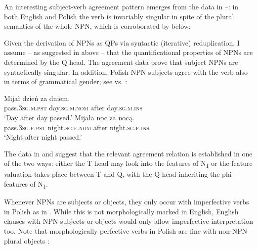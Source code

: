 \documentclass[output=paper]{langscibook}
\begin{document}
\noindent An interesting subject-verb agreement pattern emerges from the data in --: in both English and Polish the verb is invariably singular in spite of the plural semantics of the whole NPN, which is corroborated by  below:

\ea \label{psk:ex:key:22}  
\z
\z

\noindent Given the derivation of NPNs as QPs via syntactic (iterative) reduplication, I assume – as suggested in  above – that the quantificational properties of NPNs are determined by the Q head. The agreement data prove that subject NPNs are syntactically singular. In addition, Polish NPN subjects agree with the verb also in terms of grammatical gender; see  vs. :

\ea \label{psk:ex:23}\ea \gll Mijał dzień za dniem.\\
      pass.\textsc{3sg.m.pst} day.\textsc{sg.m.nom} after day.\textsc{sg.m.ins}\\
\glt      ‘Day after day passed.’\label{psk:ex:23:a}
\ex \gll  Mijała noc za    nocą.\\
      pass.\textsc{3sg.f.pst} night.\textsc{sg.f.nom} after night.\textsc{sg.f.ins}\\
\glt      ‘Night after night passed.’\label{psk:ex:23:b}\z
\z

\noindent The data in  and  suggest that the relevant agreement relation is established in one of the two ways: either the T head may look into the features of N\textsubscript{1} or the feature valuation takes place between T and Q, with the Q head inheriting the phi-features of N\textsubscript{1}.

Whenever NPNs are subjects or objects, they only occur with imperfective verbs in Polish as in . While this is not morphologically marked in English, English clauses with NPN subjects or objects would only allow imperfective interpretation too. Note that morphologically perfective verbs in Polish are fine with non-NPN plural objects :
\end{document}
